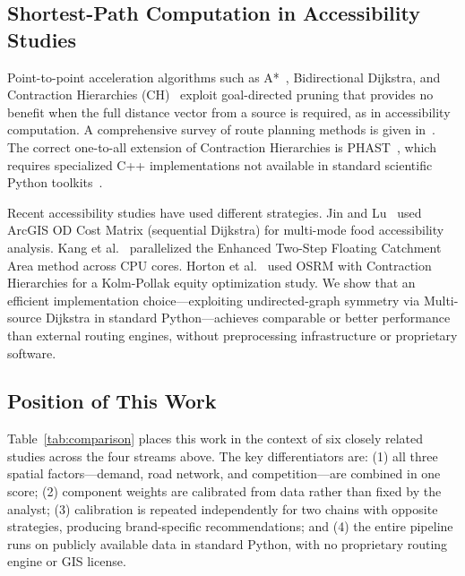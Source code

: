 \documentclass[conference]{IEEEtran}
\begin{document}
\subsection{Shortest-Path Computation in Accessibility Studies}

Point-to-point acceleration algorithms such as A*~\cite{Hart1968},
Bidirectional Dijkstra, and Contraction Hierarchies
(CH)~\cite{Geisberger2008} exploit goal-directed pruning that provides
no benefit when the full distance vector from a source is required, as
in accessibility computation. A comprehensive survey of route planning
methods is given in~\cite{Bast2016}. The correct one-to-all extension
of Contraction Hierarchies is PHAST~\cite{Delling2011}, which requires
specialized C++ implementations not available in standard scientific
Python toolkits~\cite{Virtanen2020}.

Recent accessibility studies have used different strategies.
Jin and Lu~\cite{Jin2022} used ArcGIS OD Cost Matrix (sequential
Dijkstra) for multi-mode food accessibility analysis. Kang et
al.~\cite{Kang2020} parallelized the Enhanced Two-Step Floating
Catchment Area method across CPU cores. Horton et
al.~\cite{Horton2025} used OSRM with Contraction Hierarchies for a
Kolm-Pollak equity optimization study. We show that an efficient
implementation choice---exploiting undirected-graph symmetry via
Multi-source Dijkstra in standard Python---achieves comparable or
better performance than external routing engines, without preprocessing
infrastructure or proprietary software.

\subsection{Position of This Work}

Table~\ref{tab:comparison} places this work in the context of six
closely related studies across the four streams above. The key
differentiators are: (1) all three spatial factors---demand, road
network, and competition---are combined in one score; (2) component
weights are calibrated from data rather than fixed by the analyst;
(3) calibration is repeated independently for two chains with
opposite strategies, producing brand-specific recommendations; and
(4) the entire pipeline runs on publicly available data in standard
Python, with no proprietary routing engine or GIS license.
\end{document}
